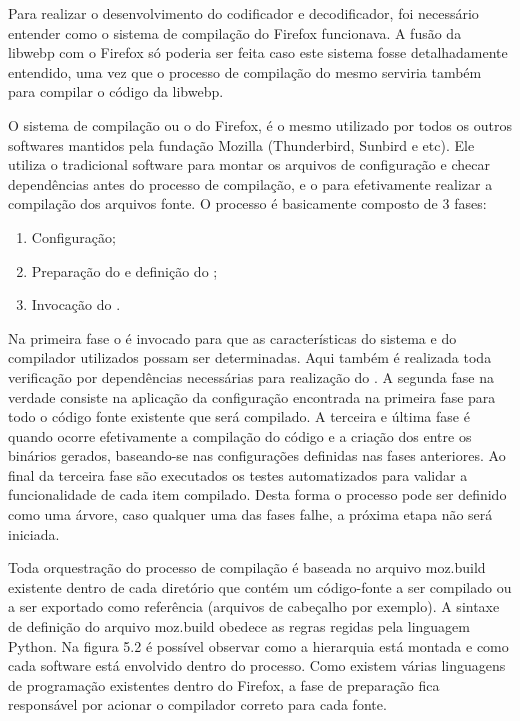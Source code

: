 \documentclass[espaco=simples,appendix=Name]{abnt}
\begin{document}
Para realizar o desenvolvimento do codificador e decodificador, foi necessário entender como o sistema de compilação do Firefox funcionava. A fusão da libwebp com o Firefox só poderia ser feita caso este sistema fosse detalhadamente entendido, uma vez que o processo de compilação do mesmo serviria também para compilar o código da libwebp.

O sistema de compilação ou o  do Firefox, é o mesmo utilizado por todos os outros softwares mantidos pela fundação Mozilla (Thunderbird, Sunbird e etc). Ele utiliza o tradicional software  para montar os arquivos de configuração e checar dependências antes do processo de compilação, e o  para efetivamente realizar a compilação dos arquivos fonte. O processo é basicamente composto de 3 fases:
\begin{enumerate}
        \item Configuração;
        \item Preparação do  e definição do ;
        \item Invocação do .
\end{enumerate}

Na primeira fase o  é invocado para que as características do sistema e do compilador utilizados possam ser determinadas. Aqui também é realizada toda verificação por dependências necessárias para realização do . A segunda fase na verdade consiste na aplicação da configuração encontrada na primeira fase para todo o código fonte existente que será compilado. A terceira e última fase é quando ocorre efetivamente a compilação do código e a criação dos  entre os binários gerados, baseando-se nas configurações definidas nas fases anteriores. Ao final da terceira fase são executados os testes automatizados para validar a funcionalidade de cada item compilado. Desta forma o processo pode ser definido como uma árvore, caso qualquer uma das fases falhe, a próxima etapa não será iniciada.

Toda orquestração do processo de compilação é baseada no arquivo moz.build existente dentro de cada diretório que contém um código-fonte a ser compilado ou a ser exportado como referência (arquivos de cabeçalho por exemplo). A sintaxe de definição do arquivo moz.build obedece as regras regidas pela linguagem Python. Na figura 5.2 é possível observar como a hierarquia está montada e como cada software está envolvido dentro do processo. Como existem várias linguagens de programação existentes dentro do Firefox, a fase de preparação fica responsável por acionar o compilador correto para cada fonte.
\end{document}
